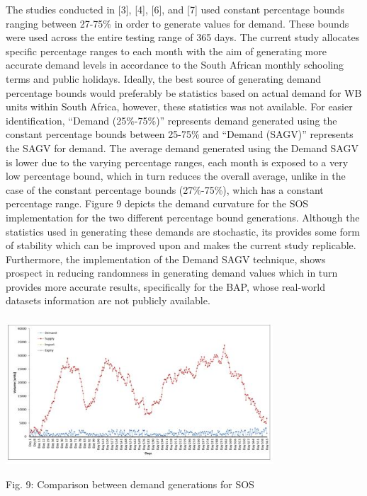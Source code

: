 \documentclass{article}
\begin{document}
The studies conducted in [3], [4], [6], and [7] used constant percentage bounds ranging between 27-75\% in order to generate values for demand. These bounds were used across the entire testing range of 365 days. The current study allocates specific percentage ranges to each month with the aim of generating more accurate demand levels in accordance to the South African monthly schooling terms and public holidays. Ideally, the best source of generating demand percentage bounds would preferably be statistics based on actual demand for WB units within South Africa, however, these statistics was not available. For easier identification, “Demand (25\%-75\%)” represents demand generated using the constant percentage bounds between 25-75\% and “Demand (SAGV)” represents the SAGV for demand. The average demand generated using the Demand SAGV is lower due to the varying percentage ranges, each month is exposed to a very low percentage bound, which in turn reduces the overall average, unlike in the case of the constant percentage bounds (27\%-75\%), which has a constant percentage range. Figure 9 depicts the demand curvature for the SOS implementation for the two different percentage bound generations. Although the statistics used in generating these demands are stochastic, its provides some form of stability which can be improved upon and makes the current study replicable. Furthermore, the implementation of the Demand SAGV technique, shows prospect in reducing randomness in generating demand values which in turn provides more accurate results, specifically for the BAP, whose real-world datasets information are not publicly available.
\\
\\
\includegraphics[width=0.75\textwidth, center]{Images/Fig8.JPG}
\begin {center}
Fig. 9: {Comparison between demand generations for SOS}

\end {center}\\
\end{document}
